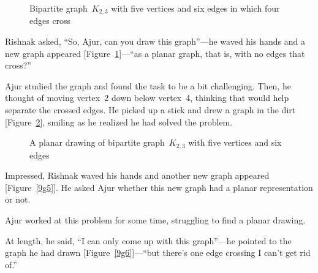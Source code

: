 \begin{figure}
\begin{center}
\caption{Bipartite graph~$K_{2,3}$ with five vertices and six edges in which four edges cross}\label{9g3}
\end{center}
\end{figure}

Rishnak asked, ``So, Ajur, can you draw this graph''---he waved his hands and a new graph appeared [Figure~\ref{9g3}]---``as a planar graph, that is, with no edges that cross?''

Ajur studied the graph and found the task to be a bit challenging. Then, he thought of moving vertex~2 down below vertex~4, thinking that would help separate the crossed edges. He picked up a stick and drew a graph in the dirt [Figure~\ref{9g4}], smiling as he realized he had solved the problem.

\begin{figure}
\begin{center}
\caption{A planar drawing of bipartite graph~$K_{2,3}$ with five vertices and six edges}\label{9g4}
\end{center}
\end{figure}

Impressed, Rishnak waved his hands and another new graph appeared [Figure~\ref{9g5}]. He asked Ajur whether this new graph had a planar representation or not.

Ajur worked at this problem for some time, struggling to find a planar drawing.

At length, he said, ``I can only come up with this graph''---he pointed to the graph he had drawn [Figure~\ref{9g6}]---``but there's one edge crossing I can't get rid of.''

